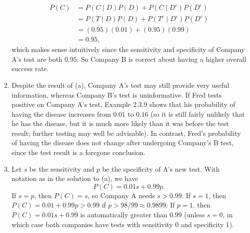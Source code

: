 \begin{exercise}[BH.2.13]
\begin{solution}
\begin{enumerate}
$$\begin{aligned}
				P(C) &=P(C \mid D) P(D)+P\left(C \mid D^c\right) P\left(D^c\right) \\
				&=P(T \mid D) P(D)+P\left(T^c \mid D^c\right) P\left(D^c\right) \\
				&=(0.95)(0.01)+(0.95)(0.99) \\
				&=0.95,
			\end{aligned}
			$$
			which makes sense intuitively since the sensitivity and specificity of Company A's test are both $0.95$. So Company B is correct about having a higher overall success rate.
			\item  Despite the result of (a), Company A's test may still provide very useful information, whereas Company B's test is uninformative. If Fred tests positive on Company A's test, Example 2.3.9 shows that his probability of having the disease increases from $0.01$ to $0.16$ (so it is still fairly unlikely that he has the disease, but it is much more likely than it was before the test result; further testing may well be advisable). In contrast, Fred's probability of having the disease does not change after undergoing Company's B test, since the test result is a foregone conclusion.
			\item Let $s$ be the sensitivity and $p$ be the specificity of A's new test. With notation as in the solution to (a), we have
			$$
			P(C)=0.01 s+0.99 p .
			$$
			If $s=p$, then $P(C)=s$, so Company A needs $s>0.99$.
			If $s=1$, then $P(C)=0.01+0.99 p>0.99$ if $p>98 / 99 \approx 0.9899$.
			If $p=1$, then $P(C)=0.01 s+0.99$ is automatically greater than $0.99$ (unless $s=0$, in which case both companies have tests with sensitivity 0 and specificity 1).
		\end{enumerate}
	\end{solution}
\end{exercise}


